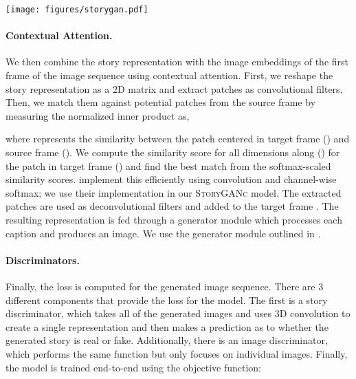 \documentclass[runningheads]{llncs}
\newcommand{\sgan}[1]{\textsc{StoryGANc}}
\begin{document}
\begin{figure*}[t]
    \centering
    \texttt{[image: figures/storygan.pdf]}
    \caption{Illustration of our \sgan{} architecture. The captions are first encoded using a pretrained language model to produce contextualized representations. These representations are sent to a contextual attention module along with the source frame, and the resulting representation is sent to the image generator. The generated frames are sent to a story and image discriminator, and the corresponding cross-entropy losses for detection real/fake images are used to train the \sgan{} model.}
    \label{fig:model_storygan}
\end{figure*}

\paragraph{Contextual Attention.}
We then combine the story representation with the image embeddings of the first frame of the image sequence using contextual attention. First, we reshape the story representation as a 2D matrix and extract  patches  as convolutional filters. Then, we match them against potential patches from the source frame  by measuring the normalized inner product as,

where  represents the similarity between the patch centered in target frame () and source frame (). We compute the similarity score for all dimensions along () for the patch in target frame () and find the best match from the softmax-scaled similarity scores. \cite{yu2018generative} implement this efficiently using convolution and channel-wise softmax; we use their implementation in our \sgan{} model. The extracted patches are used as deconvolutional filters and added to the target frame . The resulting representation is fed through a generator module which processes each caption and produces an image. We use the generator module outlined in \cite{li2019storygan}.
\paragraph{Discriminators.}
Finally, the loss is computed for the generated image sequence. There are 3 different components that provide the loss for the model. The first is a story discriminator, which takes all of the generated images and uses 3D convolution to create a single representation and then makes a prediction as to whether the generated story is real or fake. Additionally, there is an image discriminator, which performs the same function but only focuses on individual images. Finally, the model is trained end-to-end using the objective function:
\end{document}
